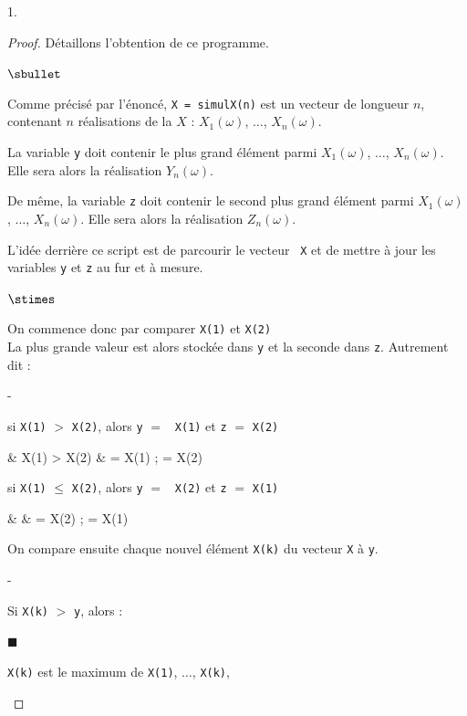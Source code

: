 \documentclass[11pt]{article}%
\begin{document}
\begin{noliste}{1.}
\begin{proof}
    
    
    
    Détaillons l'obtention de ce programme.
    \begin{noliste}{$\sbullet$}
      \item Comme précisé par l'énoncé, {\tt X = simulX(n)} est un 
      vecteur de longueur $n$, contenant $n$ réalisations de la \var 
      $X$ : $X_1(\omega)$, $\ldots$, $X_n(\omega)$.
      
      \item La variable {\tt y} doit contenir le plus grand 
      élément parmi $X_1(\omega)$, $\ldots$, $X_n(\omega)$. Elle 
      sera alors la réalisation $Y_n(\omega)$.
      
      \item De même, la variable {\tt z} doit contenir le second plus 
      grand élément parmi $X_1(\omega)$, $\ldots$, $X_n(\omega)$.
      Elle sera alors la réalisation $Z_n(\omega)$.
      
      \item L'idée derrière ce script est de parcourir le vecteur {\tt 
      X}
      et de mettre à jour les variables {\tt y} et {\tt z} au fur et 
      à mesure.
      \begin{noliste}{$\stimes$}
	\item On commence donc par comparer {\tt X(1)} et {\tt X(2)}\\
	La plus grande valeur est alors stockée dans {\tt y} et la 
	seconde dans {\tt z}. Autrement dit :
	\begin{noliste}{-}
	  \item si {\tt X(1)} $>$ {\tt X(2)}, alors {\tt y} $=$ {\tt
	  X(1)} et {\tt z} $=$ {\tt X(2)}
	  \begin{scilabC}{2}
	    & \quad {} X(1) > X(2) \nl %
	    & \quad \quad {} = X(1) ;  = X(2)
	  \end{scilabC}
	  
	  \item si {\tt X(1)} $\leq$ {\tt X(2)}, alors {\tt y} $=$ {\tt
	  X(2)} et {\tt z} $=$ {\tt X(1)}
	  \begin{scilabC}{4}
	    & \quad {} \nl %
	    & \quad \quad {} = X(2) ;  = X(1)
	  \end{scilabC}
	\end{noliste}
	
	\item On compare ensuite chaque nouvel élément {\tt X(k)} 
	du vecteur {\tt X} à {\tt y}.
	\begin{noliste}{-}
	  \item Si {\tt X(k)} $>$ {\tt y}, alors :
	\end{noliste}
	  \begin{liste}{\tiny$\blacksquare$}
	    \item {\tt X(k)} est le maximum de {\tt X(1)}, $\ldots$,
	    {\tt X(k)},
	    

\end{liste}
\end{noliste}
\end{noliste}
\end{proof}
\end{noliste}
\end{document}
